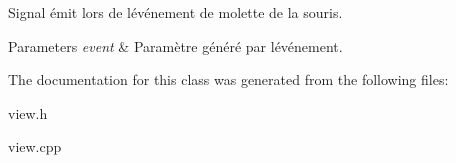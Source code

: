 Signal émit lors de l\textquotesingle{}événement de molette de la souris. 


\begin{DoxyParams}{Parameters}
{\em event} & Paramètre généré par l\textquotesingle{}événement. \\
\hline
\end{DoxyParams}


The documentation for this class was generated from the following files\+:\begin{DoxyCompactItemize}
\item 
view.\+h\item 
view.\+cpp\end{DoxyCompactItemize}

